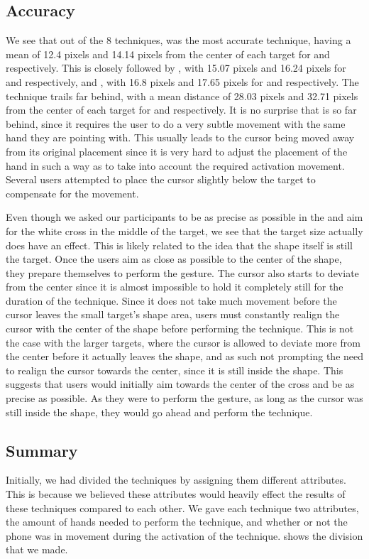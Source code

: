 \subsection{Accuracy}
\label{sec:accuracy}
We see that out of the 8 techniques, \swipe was the most accurate technique, having a mean of 12.4 pixels and 14.14 pixels from the center of each target for \pull and \push respectively. 
This is closely followed by \throw, with 15.07 pixels and 16.24 pixels for \pull and \push respectively, and \grab, with 16.8 pixels and 17.65 pixels for \push and \pull respectively.
The \tilt technique trails far behind, with a mean distance of 28.03 pixels and 32.71 pixels from the center of each target for \push and \pull respectively.   
It is no surprise that \tilt is so far behind, since it requires the user to do a very subtle movement with the same hand they are pointing with.
This usually leads to the cursor being moved away from its original placement since it is very hard to adjust the placement of the hand in such a way as to take into account the required activation movement. 
Several users attempted to place the cursor slightly below the target to compensate for the movement. 

Even though we asked our participants to be as precise as possible in the \accuracy and aim for the white cross in the middle of the target, we see that the target size actually does have an effect.
This is likely related to the idea that the shape itself is still the target. 
Once the users aim as close as possible to the center of the shape, they prepare themselves to perform the gesture. 
The cursor also starts to deviate from the center since it is almost impossible to hold it completely still for the duration of the technique.
Since it does not take much movement before the cursor leaves the small target's shape area, users must constantly realign the cursor with the center of the shape before performing the technique.
This is not the case with the larger targets, where the cursor is allowed to deviate more from the center before it actually leaves the shape, and as such not prompting the need to realign the cursor towards the center, since it is still inside the shape. 
This suggests that users would initially aim towards the center of the cross and be as precise as possible. 
As they were to perform the gesture, as long as the cursor was still inside the shape, they would go ahead and perform the technique.

\subsection{Summary}
Initially, we had divided the techniques by assigning them different attributes. 
This is because we believed these attributes would heavily effect the results of these techniques compared to each other.
We gave each technique two attributes, the amount of hands needed to perform the technique, and whether or not the phone was in movement during the activation of the technique.
 shows the division that we made.


